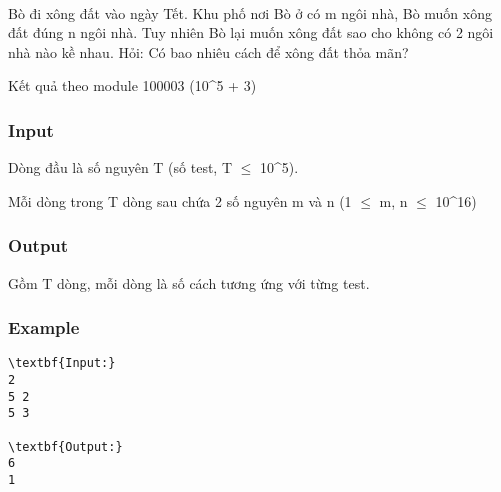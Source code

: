 

 

Bò đi xông đất vào ngày Tết. Khu phố nơi Bò ở có m ngôi nhà, Bò muốn xông đất đúng n ngôi nhà. Tuy nhiên Bò lại muốn xông đất sao cho không có 2 ngôi nhà nào kề nhau. Hỏi: Có bao nhiêu cách để xông đất thỏa mãn?

Kết quả theo module 100003 (10^5 + 3)

\subsubsection{Input}

Dòng đầu là số nguyên T (số test, T  $\le$  10^5).

Mỗi dòng trong T dòng sau chứa 2 số nguyên m và n (1  $\le$  m, n  $\le$  10^16)

\subsubsection{Output}

Gồm T dòng, mỗi dòng là số cách tương ứng với từng test.

\subsubsection{Example}
\begin{verbatim}
\textbf{Input:}
2
5 2
5 3

\textbf{Output:}
6
1\end{verbatim}

